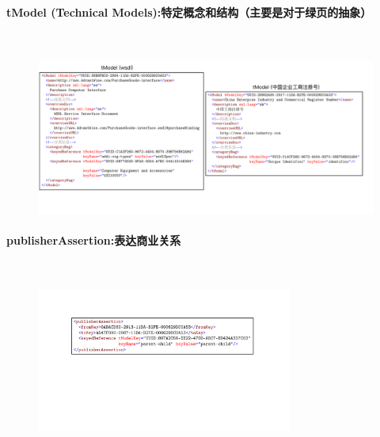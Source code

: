 \paragraph*{tModel (Technical Models):特定概念和结构（主要是对于绿页的抽象）}~{} \par
\begin{figure}[H]
    \vspace{-0.5em}
	\centering
	\includegraphics[width=\textwidth]{images/tModel.pdf}
    \vspace{-3em}
\end{figure}

\paragraph*{publisherAssertion:表达商业关系}~{} \par
\begin{figure}[H]
    \vspace{-0.5em}
	\centering
	\includegraphics[width=0.75\textwidth]{images/publisherAssertion.pdf}
    \vspace{-1em}
\end{figure}

